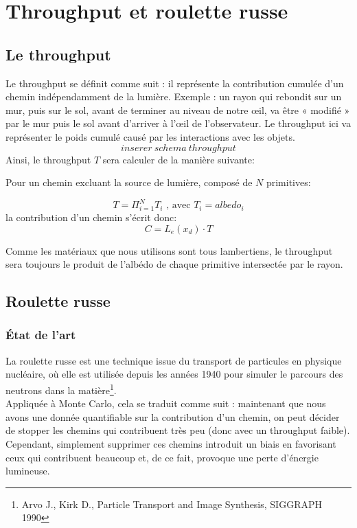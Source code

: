 


\section{Throughput et roulette russe}
\subsection{Le throughput}
Le throughput se définit comme suit : il représente la contribution cumulée d’un chemin indépendamment de la lumière. Exemple : un rayon qui rebondit sur un mur, puis sur le sol, avant de terminer au niveau de notre œil, va être « modifié » par le mur puis le sol avant d’arriver à l’\oe il de l’observateur. Le throughput ici va représenter le poids cumulé causé par les interactions avec les objets.\\
$$inserer\ schema\ throughput$$
Ainsi, le throughput $T$ sera calculer de la manière suivante:

Pour un chemin excluant la source de lumière, composé de $N$ primitives:

$$T=\Pi^N_{i=1}T_i\text{	,   avec }T_i=albedo_i$$
la contribution d'un chemin s'écrit donc:
$$
C=L_e(x_d)\cdot T
$$

Comme les matériaux que nous utilisons sont tous lambertiens, le throughput sera toujours le produit de l'albédo de chaque primitive intersectée par le rayon.
\subsection{Roulette russe}
\subsubsection{État de l'art}
La roulette russe est une technique issue du transport de particules en physique nucléaire, où elle est utilisée depuis les années 1940 pour simuler le parcours des neutrons dans la matière\footnote{Arvo J., Kirk D., Particle Transport and Image Synthesis, SIGGRAPH 1990}.\\
 
Appliquée à Monte Carlo, cela se traduit comme suit : maintenant que nous avons une donnée quantifiable sur la contribution d’un chemin, on peut décider de stopper les chemins qui contribuent très peu (donc avec un throughput faible). Cependant, simplement supprimer ces chemins introduit un biais en favorisant ceux qui contribuent beaucoup et, de ce fait, provoque une perte d’énergie lumineuse.\\


